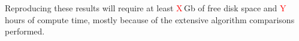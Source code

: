 \documentclass{elsarticle}
\newcommand{\todo}[1]{\textcolor{red}{#1}}
\begin{document}
Reproducing these results will require at least \todo{X}\,Gb of free disk space
and \todo{Y}\,hours of compute time, mostly because of the extensive algorithm 
comparisons performed.






\begin{comment}
We employ two criteria for comparing the proposed search methods to the benchmark: the message length and the Kullback Leibler divergence~\cite{kullback1951information}.

\paragraph{Message Length}

\paragraph{Kullback Leibler divergence}
\end{comment}
\end{document}
